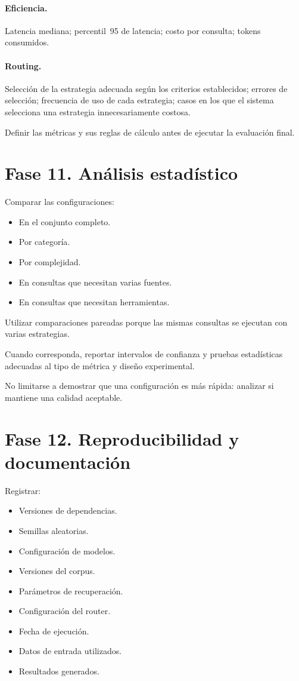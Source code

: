 \documentclass[11pt,a4paper]{article}
\begin{document}
\paragraph{Eficiencia.}
Latencia mediana; percentil~95 de latencia; costo por consulta; tokens consumidos.

\paragraph{Routing.}
Selección de la estrategia adecuada según los criterios establecidos; errores de selección; frecuencia de uso de cada estrategia; casos en los que el sistema selecciona una estrategia innecesariamente costosa.

Definir las métricas y sus reglas de cálculo antes de ejecutar la evaluación final.

\section{Fase 11. Análisis estadístico}

Comparar las configuraciones:

\begin{itemize}
  \item En el conjunto completo.
  \item Por categoría.
  \item Por complejidad.
  \item En consultas que necesitan varias fuentes.
  \item En consultas que necesitan herramientas.
\end{itemize}

Utilizar comparaciones pareadas porque las mismas consultas se ejecutan con varias estrategias.

Cuando corresponda, reportar intervalos de confianza y pruebas estadísticas adecuadas al tipo de métrica y diseño experimental.

No limitarse a demostrar que una configuración es más rápida: analizar si mantiene una calidad aceptable.

\section{Fase 12. Reproducibilidad y documentación}

Registrar:

\begin{itemize}
  \item Versiones de dependencias.
  \item Semillas aleatorias.
  \item Configuración de modelos.
  \item Versiones del corpus.
  \item Parámetros de recuperación.
  \item Configuración del router.
  \item Fecha de ejecución.
  \item Datos de entrada utilizados.
  \item Resultados generados.
\end{itemize}
\end{document}

